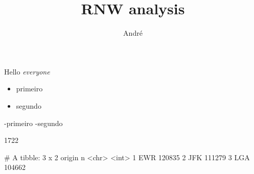 \documentclass{article}
\title{RNW analysis}
\author{André}
\begin{document}


\maketitle

Hello \textit{everyone}

\begin{itemize}
\item primeiro
\item segundo 
\end {itemize}

-primeiro
-segundo

\begin{Schunk}
\begin{Soutput}
[1] 1722
\end{Soutput}
\begin{Soutput}
# A tibble: 3 x 2
  origin      n
  <chr>   <int>
1 EWR    120835
2 JFK    111279
3 LGA    104662
\end{Soutput}
\end{Schunk}
\end{document}
